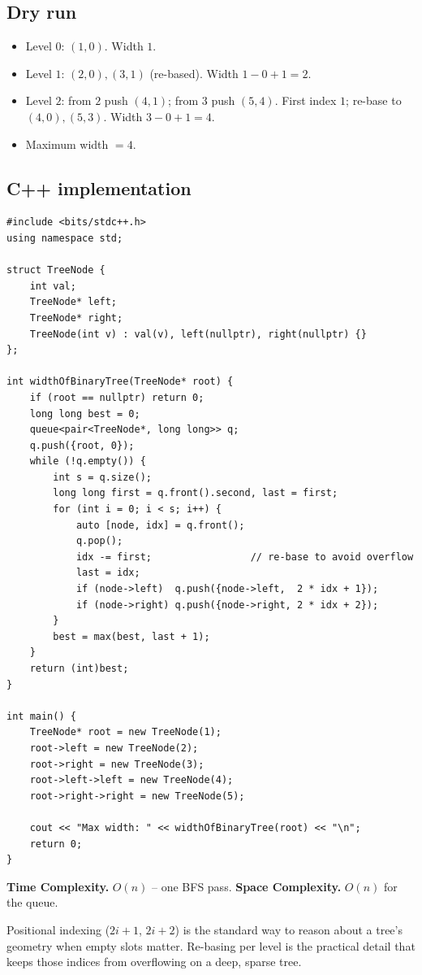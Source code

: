 \subsection*{Dry run}


\begin{itemize}
  \item Level $0$: $(1,0)$. Width $1$.
  \item Level $1$: $(2,0),(3,1)$ (re-based). Width $1-0+1=2$.
  \item Level $2$: from $2$ push $(4,1)$; from $3$ push $(5,4)$. First
        index $1$; re-base to $(4,0),(5,3)$. Width $3-0+1=4$.
  \item Maximum width $=4$.
\end{itemize}

\subsection*{C++ implementation}

\begin{lstlisting}
#include <bits/stdc++.h>
using namespace std;

struct TreeNode {
    int val;
    TreeNode* left;
    TreeNode* right;
    TreeNode(int v) : val(v), left(nullptr), right(nullptr) {}
};

int widthOfBinaryTree(TreeNode* root) {
    if (root == nullptr) return 0;
    long long best = 0;
    queue<pair<TreeNode*, long long>> q;
    q.push({root, 0});
    while (!q.empty()) {
        int s = q.size();
        long long first = q.front().second, last = first;
        for (int i = 0; i < s; i++) {
            auto [node, idx] = q.front();
            q.pop();
            idx -= first;                 // re-base to avoid overflow
            last = idx;
            if (node->left)  q.push({node->left,  2 * idx + 1});
            if (node->right) q.push({node->right, 2 * idx + 2});
        }
        best = max(best, last + 1);
    }
    return (int)best;
}

int main() {
    TreeNode* root = new TreeNode(1);
    root->left = new TreeNode(2);
    root->right = new TreeNode(3);
    root->left->left = new TreeNode(4);
    root->right->right = new TreeNode(5);

    cout << "Max width: " << widthOfBinaryTree(root) << "\n";
    return 0;
}
\end{lstlisting}

\begin{complexitybox}
\textbf{Time Complexity.} $O(n)$ -- one BFS pass. \textbf{Space
Complexity.} $O(n)$ for the queue.
\end{complexitybox}

\begin{takeawaybox}
Positional indexing ($2i+1$, $2i+2$) is the standard way to reason about a
tree's geometry when empty slots matter. Re-basing per level is the
practical detail that keeps those indices from overflowing on a deep,
sparse tree.
\end{takeawaybox}

